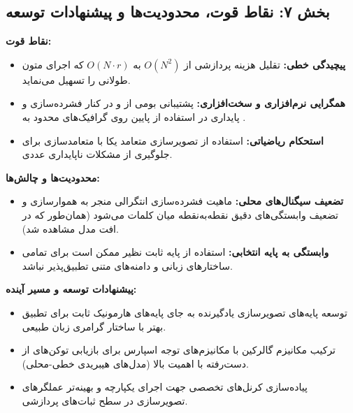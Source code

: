 \subsection*{بخش ۷: نقاط قوت، محدودیت‌ها و پیشنهادات توسعه }
\textbf{نقاط قوت:}
\begin{itemize}
    \item \textbf{پیچیدگی خطی:} تقلیل هزینه پردازشی از $O(N^2)$ به $O(N \cdot r)$ که اجرای متون طولانی را تسهیل می‌نماید.
    \item \textbf{همگرایی نرم‌افزاری و سخت‌افزاری:} پشتیبانی بومی از  و  در کنار فشرده‌سازی  و پایداری در استفاده از  پایین روی گرافیک‌های محدود به .
    \item \textbf{استحکام ریاضیاتی:} استفاده از تصویرسازی متعامد یکا با متعامدسازی  برای جلوگیری از مشکلات ناپایداری عددی.
\end{itemize}

\textbf{محدودیت‌ها و چالش‌ها:}
\begin{itemize}
    \item \textbf{تضعیف سیگنال‌های محلی:} ماهیت فشرده‌سازی انتگرالی منجر به هموارسازی و تضعیف وابستگی‌های دقیق نقطه‌به‌نقطه میان کلمات می‌شود (همان‌طور که در افت  مدل  مشاهده شد).
    \item \textbf{وابستگی به پایه انتخابی:} استفاده از پایه ثابت نظیر  ممکن است برای تمامی ساختارهای زبانی و دامنه‌های متنی تطبیق‌پذیر نباشد.
\end{itemize}

\textbf{پیشنهادات توسعه و مسیر آینده:}
\begin{itemize}
    \item توسعه پایه‌های تصویرسازی یادگیرنده  به جای پایه‌های هارمونیک ثابت برای تطبیق بهتر با ساختار گرامری زبان طبیعی.
    \item ترکیب مکانیزم گالرکین با مکانیزم‌های توجه اسپارس  برای بازیابی توکن‌های از دست‌رفته با اهمیت بالا (مدل‌های هیبریدی خطی-محلی).
    \item پیاده‌سازی کرنل‌های تخصصی  جهت اجرای یکپارچه و بهینه‌تر عملگرهای تصویرسازی در سطح ثبات‌های پردازشی.
\end{itemize}

